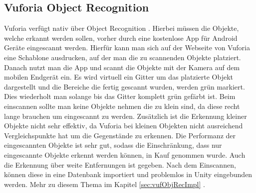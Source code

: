 \subsection{Vuforia Object Recognition}
\label{sec:vufObjRec}
Vuforia verfügt nativ über Object Recognition \cite{VufObjRec}. Hierbei müssen die Objekte, welche erkannt werden sollen, vorher durch eine kostenlose App für Android Geräte eingescannt werden. Hierfür kann man sich auf der Webseite von Vuforia eine Schablone ausdrucken, auf der man die zu scannenden Objekte platziert. Danach nutzt man die App und scannt die Objekte mit der Kamera auf dem mobilen Endgerät ein. Es wird virtuell ein Gitter um das platzierte Objekt dargestellt und die Bereiche die fertig gescannt wurden, werden grün markiert. Dies wiederholt man solange bis das Gitter komplett grün gefärbt ist.  Beim einscannen sollte man keine Objekte nehmen die zu klein sind, da diese recht lange brauchen um eingescannt zu werden. Zusätzlich ist die Erkennung kleiner Objekte nicht sehr effektiv, da Vuforia bei kleinen Objekten nicht ausreichend Vergleichspunkte hat um die Gegenstände zu erkennen. Die Performanz der eingescannten Objekte ist sehr gut, sodass die Einschränkung, dass nur eingescannte Objekte erkennt werden können, in Kauf genommen wurde. Auch die Erkennung über weite Entfernungen ist gegeben. Nach dem Einscannen, können diese in eine Datenbank importiert und problemlos in Unity eingebunden werden. Mehr zu diesem Thema im Kapitel \ref{sec:vufObjRecImpl} .
